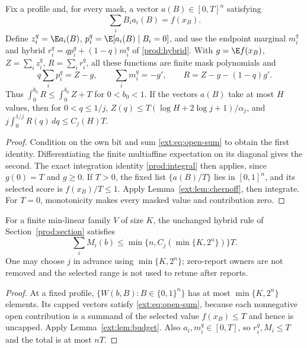 \begin{lemma}\label{ext:lem:budget}
Fix a profile and, for every mask, a vector $a(B)\in[0,T]^n$ satisfying
\begin{equation}\label{ext:eq:open-sum}
 \sum_iB_i a_i(B)=f(x_B).
\end{equation}
Define $z_i^q=\E a_i(B)$, $p_i^q=\E[a_i(B)\mid B_i=0]$, and use the endpoint
marginal $m_i^q$ and hybrid $r_i^q=qp_i^q+(1-q)m_i^q$ of
\eqref{prod:hybrid}.  With $g=\E f(x_B)$, $Z=\sum_i z_i^q$, $R=\sum_i r_i^q$,
all these functions are finite mask polynomials and
\[
 q\sum_i p_i^q=Z-g,\qquad \sum_i m_i^q=-g',\qquad R=Z-g-(1-q)g'.
\]
Thus $\int_0^{b_0}R\le\int_0^{b_0}Z+T$ for $0<b_0<1$.
If the vectors $a(B)$ take at most $H$ values, then for $0<q\le1/j$,
$Z(q)\le T(\log H+2\log j+1)/\alpha_j$, and
$j\int_0^{1/j}R(q)\,dq\le C_j(H)T$.
\end{lemma}
\begin{proof}
Condition on the own bit and sum \eqref{ext:eq:open-sum} to obtain the first
identity.  Differentiating the finite multiaffine expectation on its diagonal
gives the second.  The exact integration identity \eqref{prod:integral}
then applies, since $g(0)=T$ and $g\ge0$.
If $T>0$, the fixed list $\{a(B)/T\}$ lies in $[0,1]^n$, and its selected
score is $f(x_B)/T\le1$.  Apply Lemma~\ref{ext:lem:chernoff}, then integrate.
For $T=0$, monotonicity makes every masked value and contribution zero.
\end{proof}

\begin{proposition}\label{ext:prop:range}
For a finite min-linear family $V$ of size $K$, the unchanged hybrid rule
of Section~\ref{prod:section} satisfies
\[
 \sum_iM_i(b)\le\min\{n,C_j(\min\{K,2^n\})\}T.
\]
One may choose $j$ in advance using $\min\{K,2^n\}$; zero-report owners
are not removed and the selected range is not used to retune after reports.
\end{proposition}
\begin{proof}
At a fixed profile, $\{W(b,B):B\in\{0,1\}^n\}$ has at most
$\min\{K,2^n\}$ elements.  Its capped vectors satisfy
\eqref{ext:eq:open-sum}, because each nonnegative open contribution is a
summand of the selected value $f(x_B)\le T$ and hence is uncapped.
Apply Lemma~\ref{ext:lem:budget}.  Also $a_i,m_i^q\in[0,T]$, so
$r_i^q,M_i\le T$ and the total is at most $nT$.
\end{proof}

